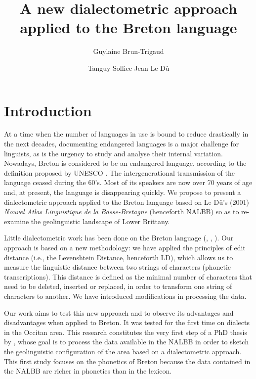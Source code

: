 \documentclass[output=paper]{LSP/langsci}
\author{Guylaine Brun-Trigaud\affiliation{CNRS \& Université de Nice-Sophia-Antipolis, France}\and Tanguy Solliec\affiliation{Université de Paris Descartes, France} \lastand Jean Le Dû\affiliation{Université de Bretagne Occidentale, France}}
\title{A new dialectometric approach applied to the Breton language}
\begin{document}
 

% 
% 

 

\section{Introduction}

At a time when the number of languages in use is bound to reduce drastically in the next decades, documenting endangered languages is a major challenge for linguists, as is the urgency to study and analyse their internal variation. Nowadays, Breton is considered to be an endangered language, according to the definition proposed by UNESCO \citep{moseley_atlas_2010}. The intergenerational transmission of the language ceased during the 60’s. Most of its speakers are now over 70 years of age and, at present, the language is disappearing quickly. We propose to present a dialectometric approach applied to the Breton language based on Le Dû's (2001) \textit{Nouvel Atlas Linguistique de la Basse-Bretagne} (henceforth NALBB) \citep{le_du_nouvel_2001} so as to re-examine the geolinguistic landscape of Lower Brittany.

Little dialectometric work has been done on the Breton language (\citealt{german_etude_1984}, \citealt{german_methode_1991}, \citealt{costaouec_linguistic_2012}). Our approach is based on a new methodology: we have applied the principles of edit distance (i.e., the Levenshtein Distance, henceforth LD), which allows us to measure the linguistic distance between two strings of characters (phonetic transcriptions). This distance is defined as the minimal number of characters that need to be deleted, inserted or replaced, in order to transform one string of characters to another. We have introduced modifications in processing the data.

Our work aims to test this new approach and to observe its advantages and disadvantages when applied to Breton. It was tested for the first time on dialects in the Occitan area. This research constitutes the very first step of a PhD thesis by \citet{solliec_dialectometrie_2014}, whose goal is to process the data available in the NALBB in order to sketch the geolinguistic configuration of the area based on a dialectometric approach. This first study focuses on the phonetics of Breton because the data contained in the NALBB are richer in phonetics than in the lexicon.
\end{document}
